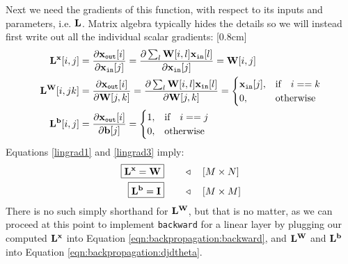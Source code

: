 Next we need the gradients of this function, with respect to its inputs and parameters, i.e. $\mathbf{L}$. Matrix algebra typically hides the details so we will instead first write out all the individual scalar gradients:
[0.8cm]
\begin{align}
    \mathbf{L}^{\mathbf{x}}[i,j] &= \frac{\partial \mathbf{x}_{\texttt{out}}[i]}{\partial \mathbf{x}_{\texttt{in}}[j]} = \frac{\partial \sum_l \mathbf{W}[i,l] \mathbf{x}_{\texttt{in}}[l]}{\partial \mathbf{x}_{\texttt{in}}[j]} = \mathbf{W}[i,j] \label{lingrad1}\\
    \mathbf{L}^{\mathbf{W}}[i,jk] &= \frac{\partial \mathbf{x}_{\texttt{out}}[i]}{\partial \mathbf{W}[j,k]} = \frac{\partial \sum_l \mathbf{W}[i,l] \mathbf{x}_{\texttt{in}}[l]}{\partial \mathbf{W}[j,k]} = 
    \begin{cases}
        \mathbf{x}_{\texttt{in}}[j], &\text{if} \quad i == k\\
        0,      & \text{otherwise}
    \end{cases} \label{lingrad2}\\
    \mathbf{L}^{\mathbf{b}}[i,j] &= \frac{\partial \mathbf{x}_{\texttt{out}}[i]}{\partial \mathbf{b}[j]} = 
    \begin{cases}
        1, &\text{if} \quad i == j\\
        0, & \text{otherwise}
    \end{cases} \label{lingrad3}
\end{align}
Equations \ref{lingrad1} and \ref{lingrad3} imply:
\begin{align}
    \boxed{\mathbf{L}^{\mathbf{x}} = \mathbf{W}} &\quad\quad \triangleleft \quad [M \times N]\\
    \boxed{\mathbf{L}^{\mathbf{b}} = \mathbf{I}} &\quad\quad \triangleleft \quad [M \times M]
\end{align}
There is no such simply shorthand for $\mathbf{L}^\mathbf{W}$, but that is no matter, as we can proceed at this point to implement \texttt{backward} for a linear layer by plugging our computed $\mathbf{L}^\mathbf{x}$ into Equation \ref{eqn:backpropagation:backward}, and $\mathbf{L}^\mathbf{W}$ and $\mathbf{L}^\mathbf{b}$ into Equation \ref{eqn:backpropagation:djdtheta}.%
